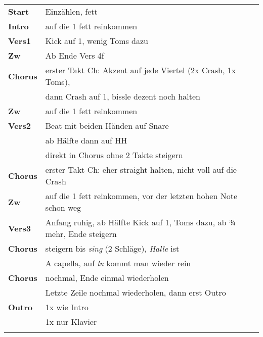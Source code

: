 \begin{tabular}{p{1.6cm}l}
	\textbf{Start}  & Einzählen, fett                                                         \\
	\textbf{Intro}  & auf die 1 fett reinkommen                                               \\
	\textbf{Vers1}  & Kick auf 1, wenig Toms dazu                                             \\
	\textbf{Zw}     & Ab Ende Vers 4f                                                         \\
	\textbf{Chorus} & erster Takt Ch: Akzent auf jede Viertel (2x Crash, 1x Toms),            \\
	                & dann Crash auf 1, bissle dezent noch halten                             \\
	\textbf{Zw}     & auf die 1 fett reinkommen                                               \\
	\textbf{Vers2}  & Beat mit beiden Händen auf Snare                                        \\
	                & ab Hälfte dann auf HH                                                   \\
	                & direkt in Chorus ohne 2 Takte steigern                                  \\
	\textbf{Chorus} & erster Takt Ch: eher straight halten, nicht voll auf die Crash          \\
	\textbf{Zw}     & auf die 1 fett reinkommen, vor der letzten hohen Note schon weg         \\
	\textbf{Vers3}  & Anfang ruhig, ab Hälfte Kick auf 1, Toms dazu, ab ¾ mehr, Ende steigern \\
	\textbf{Chorus} & steigern bis \textit{sing} (2 Schläge), \textit{Halle} ist              \\
	                & A capella, auf \textit{lu} kommt man wieder rein                        \\
	\textbf{Chorus} & nochmal, Ende einmal wiederholen                                        \\
	                & Letzte Zeile nochmal wiederholen, dann erst Outro                       \\
	\textbf{Outro}  & 1x wie Intro                                                            \\
	                & 1x nur Klavier                                                          \\
	                &                                                                         \\
\end{tabular}

